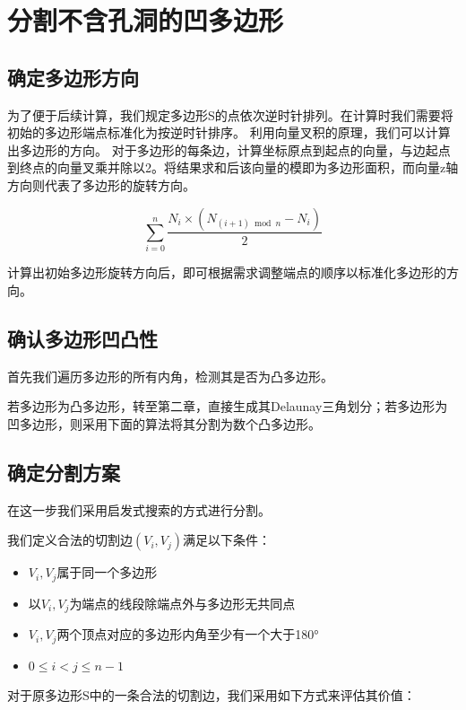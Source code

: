 \chapter{分割不含孔洞的凹多边形}


\section{确定多边形方向}
为了便于后续计算，我们规定多边形S的点依次逆时针排列。在计算时我们需要将初始的多边形端点标准化为按逆时针排序。
利用向量叉积的原理，我们可以计算出多边形的方向。
对于多边形的每条边，计算坐标原点到起点的向量，与边起点到终点的向量叉乘并除以2。将结果求和后该向量的模即为多边形面积，而向量z轴方向则代表了多边形的旋转方向。

\begin{equation}
\sum\limits_{i=0}^{n}{\frac{N_i\times (N_{(i+1)\bmod n}-N_i)}{2}}
\end{equation}

计算出初始多边形旋转方向后，即可根据需求调整端点的顺序以标准化多边形的方向。

\section{确认多边形凹凸性}
首先我们遍历多边形的所有内角，检测其是否为凸多边形。

若多边形为凸多边形，转至第二章，直接生成其Delaunay三角划分；若多边形为凹多边形，则采用下面的算法将其分割为数个凸多边形。
\section{确定分割方案}
在这一步我们采用启发式搜索的方式进行分割。

我们定义合法的切割边\(( V_i,V_j) \)满足以下条件：

\begin{itemize}
    \item \(V_i,V_j\)属于同一个多边形
    \item 以\(V_i,V_j\)为端点的线段除端点外与多边形无共同点
    \item \(V_i,V_j\)两个顶点对应的多边形内角至少有一个大于180°
    \item \(0\le i<j\le n-1\)
\end{itemize}
对于原多边形S中的一条合法的切割边，我们采用如下方式来评估其价值：

